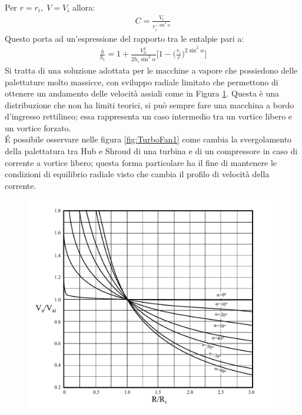 Per $r=r_i,\; V=V_i$ allora:
\begin{align*}
C = \frac{V_i}{r_i^{-\sin^2 \alpha}}
\end{align*}
Questo porta ad un'espressione del rapporto tra le entalpie pari a:
\begin{align*}
\boxed{ \frac{h}{h_i} =  1+ \frac{V_{ti}^2}{2 h_i \sin^2 \alpha} \bigg[1- \bigg(\frac{r_i}{r} \bigg) ^{2 \sin^2 \alpha} \bigg]}
\end{align*}
Si tratta di una soluzione adottata per le macchine a vapore che possiedono delle palettature molto massicce, con sviluppo radiale limitato che permettono di ottenere un andamento delle velocità assiali come in Figura \ref{fig:AngPalCost}. Questa è una distribuzione che non ha limiti teorici, si può sempre fare una macchina a bordo d'ingresso rettilineo; essa rappresenta un caso intermedio tra un vortice libero e un vortice forzato.\\
\'E possibile osservare nelle figura \ref{fig:TurboFan1} come cambia la svergolamento della palettatura tra Hub e Shroud di una turbina e di un compressore in caso di corrente a vortice libero; questa forma particolare ha il fine di mantenere le condizioni di equilibrio radiale visto che cambia il profilo di velocità della corrente.
\begin{figure}
\centering
  \includegraphics[width=.8\textwidth]{fig/AngPalCost.pdf}
\caption{}
\label{fig:AngPalCost}
\end{figure}
